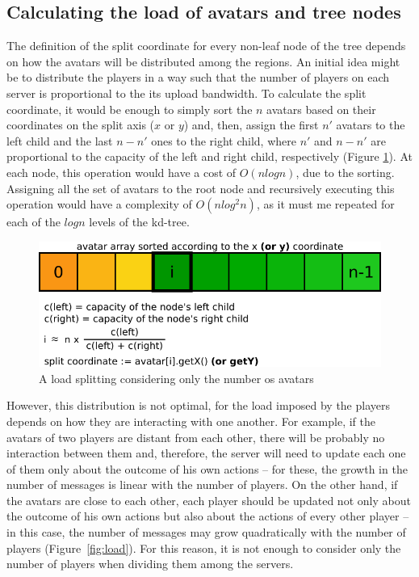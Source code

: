 \documentclass[acmjacm]{acmtrans2m}
\newcommand{\figurecaption}{Figure}
\begin{document}
\subsection{Calculating the load of avatars and tree nodes}

The definition of the split coordinate for every non-leaf node of the tree depends on how the avatars will be distributed among the regions. An initial idea might be to distribute the players in a way such that the number of players on each server is proportional to the its upload bandwidth. To calculate the split coordinate, it would be enough to simply sort the $n$ avatars based on their coordinates on the split axis ($x$ or $y$) and, then, assign the first $n'$ avatars to the left child and the last $n - n'$ ones to the right child, where $n'$ and $n - n'$ are proportional to the capacity of the left and right child, respectively (\figurecaption{} \ref{fig:vector}). At each node, this operation would have a cost of $O(nlogn)$, due to the sorting. Assigning all the set of avatars to the root node and recursively executing this operation would have a complexity of $O(nlog^2n)$, as it must me repeated for each of the $logn$ levels of the kd-tree.

\begin{figure}
  \centering
  \includegraphics[width=0.8\linewidth]{images/vector}
  \caption{A load splitting considering only the number os avatars}
  \label{fig:vector}
\end{figure}

However, this distribution is not optimal, for the load imposed by the players depends on how they are interacting with one another. For example, if the avatars of two players are distant from each other, there will be probably no interaction between them and, therefore, the server will need to update each one of them only about the outcome of his own actions -- for these, the growth in the number of messages is linear with the number of players. On the other hand, if the avatars are close to each other, each player should be updated not only about the outcome of his own actions but also about the actions of every other player -- in this case, the number of messages may grow quadratically with the number of players \mbox{(\figurecaption{} \ref{fig:load})}. For this reason, it is not enough to consider only the number of players when dividing them among the servers.
\end{document}
